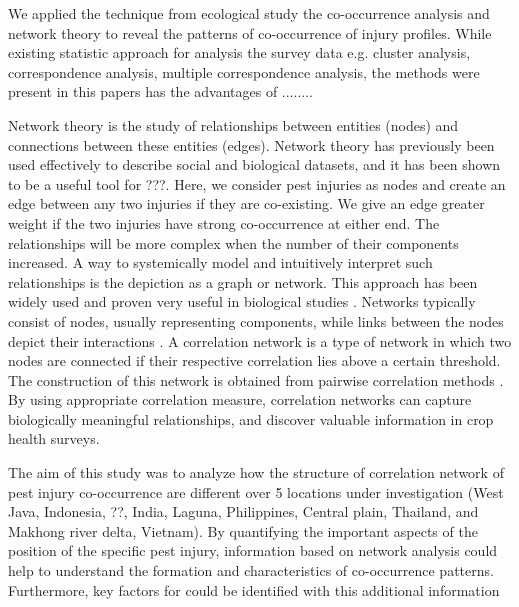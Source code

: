 We applied the technique from ecological study the co-occurrence analysis and network theory to reveal the patterns of co-occurrence of injury profiles. While existing statistic approach for analysis the survey data e.g. cluster analysis, correspondence analysis, multiple correspondence analysis, the methods were present in this papers has the advantages of ........

Network theory is the study of relationships between entities (nodes) and connections between these entities (edges). Network theory has previously been used effectively to describe social and biological datasets, and it has been shown to be a useful tool for ???. Here, we consider pest injuries as nodes and create an edge between any two injuries if they are co-existing. We give an edge greater weight if the two injuries have strong co-occurrence at either end.  The relationships will be more complex when the number of their components increased. A way to systemically model and intuitively interpret such relationships is the depiction as a graph or network. This approach has been widely used and proven very useful in biological studies \cite{Moslonka_Lefebvre_2011}. Networks typically consist of nodes, usually representing components, while links between the nodes depict their interactions \cite{Proulx_2005}. A correlation network is a type of network in which two nodes are connected if their respective correlation lies above a certain threshold. The construction of this network is obtained from pairwise correlation methods \cite{Toubiana_2013}. By using appropriate correlation measure, correlation networks can capture biologically meaningful relationships, and discover valuable information in crop health surveys.

The aim of this study was to analyze how the structure of correlation network of pest injury co-occurrence are different over 5 locations under investigation (West Java, Indonesia, ??, India, Laguna, Philippines, Central plain, Thailand, and Makhong river delta, Vietnam). By quantifying the important aspects of the position of the specific pest injury, information based on network analysis could help to understand the formation and characteristics of co-occurrence patterns. Furthermore, key factors for could be identified with this additional information